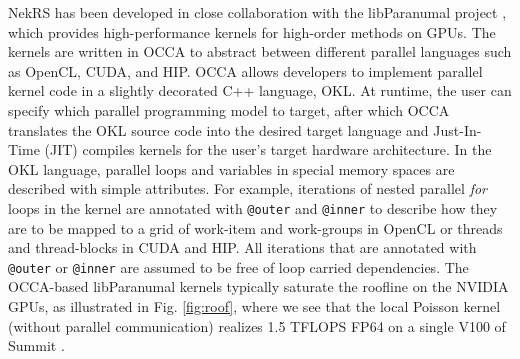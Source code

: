NekRS has been developed in close collaboration with the libParanumal project
\cite{warburton2019,ChalmersKarakusAustinSwirydowiczWarburton2020,streamParanumal2020},
which provides high-performance kernels for high-order methods on GPUs.  The
kernels are written in OCCA to abstract between different parallel languages
such as OpenCL, CUDA, and HIP. OCCA allows developers to implement parallel
kernel code in a slightly decorated C++ language, OKL.  At runtime, the user
can specify which parallel programming model to target, after which OCCA
translates the OKL source code into the desired target language and
Just-In-Time (JIT) compiles kernels for the user's target hardware
architecture.  In the OKL language, parallel loops and variables in special
memory spaces are described with simple attributes. For example, iterations of
nested parallel {\em for} loops in the kernel are annotated with
\texttt{@outer} and \texttt{@inner} to describe how they are to be mapped to a
grid of work-item and work-groups in OpenCL or threads and thread-blocks in
CUDA and HIP. All iterations that are annotated with \texttt{@outer} or
\texttt{@inner} are assumed to be free of loop carried dependencies. 
The OCCA-based libParanumal kernels
typically saturate the roofline on the NVIDIA GPUs, as illustrated
in Fig. \ref{fig:roof}, where we see that the local Poisson kernel
(without parallel communication) realizes 1.5 TFLOPS FP64 on a single V100
of Summit \cite{ceed_bp_paper_2020}.



